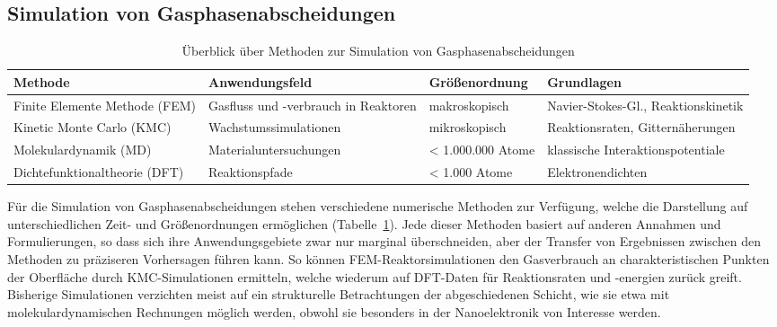 \subsection{Simulation von Gasphasenabscheidungen}

\begin{table}
  \oddrowcolors
  \caption[Überblick über Methoden zur Simulation von Gasphasenabscheidungen]{Überblick über Methoden zur Simulation von Gasphasenabscheidungen}
  \label{tab:deposition-simulations}
  \begin{tabularx}{\textwidth}{|XXlX|}
    \hline
    Methode                           & Anwendungsfeld                       & Größenordnung     & Grundlagen                          \\
    \hline
    Finite Elemente Methode (FEM)     & Gasfluss und -verbrauch in Reaktoren & makroskopisch     & Navier-Stokes-Gl., Reaktionskinetik \\
    Kinetic Monte Carlo (KMC)         & Wachstums\-simulationen              & mikroskopisch     & Reaktionsraten, Gitternäherungen    \\
    Molekular\-dynamik (MD)           & Material\-unter\-suchungen           & < 1.000.000 Atome & klassische Interaktionspotentiale   \\
    Dichte\-funktional\-theorie (DFT) & Reaktionspfade                       & < 1.000 Atome     & Elektronendichten                   \\
    \hline
  \end{tabularx}
\end{table}


Für die Simulation von Gasphasenabscheidungen stehen verschiedene numerische Methoden zur Verfügung, welche die Darstellung auf unterschiedlichen Zeit- und Größenordnungen ermöglichen (Tabelle~\ref{tab:deposition-simulations}).
Jede dieser Methoden basiert auf anderen Annahmen und Formulierungen, so dass sich ihre Anwendungsgebiete zwar nur marginal überschneiden, aber der Transfer von Ergebnissen zwischen den Methoden zu präziseren Vorhersagen führen kann.
So können FEM-Reaktorsimulationen den Gasverbrauch an charakteristischen Punkten der Oberfläche durch KMC-Simulationen ermitteln, welche wiederum auf DFT-Daten für Reaktionsraten und -energien zurück greift.
Bisherige Simulationen verzichten meist auf ein strukturelle Betrachtungen der abgeschiedenen Schicht, wie sie etwa mit molekulardynamischen Rechnungen möglich werden, obwohl sie besonders in der Nanoelektronik von Interesse werden.
